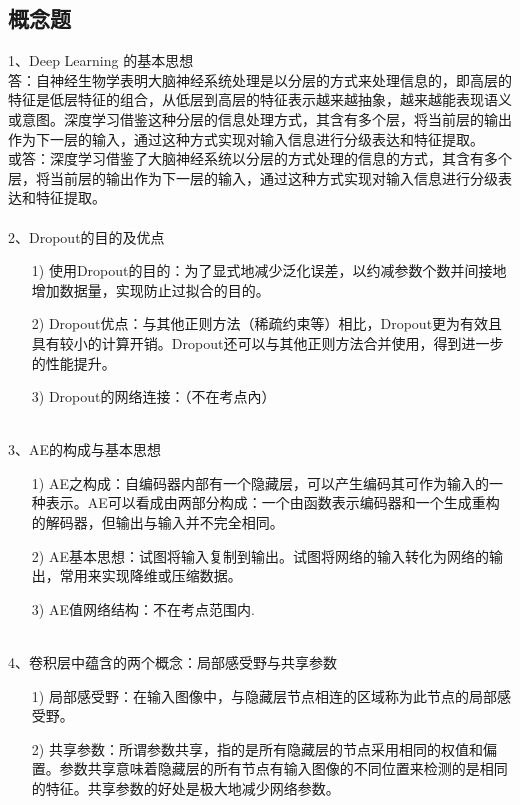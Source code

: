 \documentclass[UFT8]{ctexart}
\begin{document}
\subsection{概念题}
1、Deep Learning 的基本思想\\
答：自神经生物学表明大脑神经系统处理是以分层的方式来处理信息的，即高层的特征是低层特征的组合，从低层到高层的特征表示越来越抽象，越来越能表现语义或意图。深度学习借鉴这种分层的信息处理方式，其含有多个层，将当前层的输出作为下一层的输入，通过这种方式实现对输入信息进行分级表达和特征提取。\\
或答：深度学习借鉴了大脑神经系统以分层的方式处理的信息的方式，其含有多个层，将当前层的输出作为下一层的输入，通过这种方式实现对输入信息进行分级表达和特征提取。
~\\
~\\
 2、Dropout的目的及优点
\begin{itemize}
\item[1)] 使用Dropout的目的：为了显式地减少泛化误差，以约减参数个数并间接地增加数据量，实现防止过拟合的目的。
\item[2)] Dropout优点：与其他正则方法（稀疏约束等）相比，Dropout更为有效且具有较小的计算开销。Dropout还可以与其他正则方法合并使用，得到进一步的性能提升。
\item[3)] Dropout的网络连接：（不在考点內）
\end{itemize}
~\\
3、AE的构成与基本思想
\begin{itemize}
\item[1)] AE之构成：自编码器内部有一个隐藏层，可以产生编码其可作为输入的一种表示。AE可以看成由两部分构成：一个由函数表示编码器和一个生成重构的解码器，但输出与输入并不完全相同。
\item[2)] AE基本思想：试图将输入复制到输出。试图将网络的输入转化为网络的输出，常用来实现降维或压缩数据。
\item[3)] AE值网络结构：不在考点范围内.
\end{itemize}
~\\
4、卷积层中蕴含的两个概念：局部感受野与共享参数
\begin{itemize}
\item[1)] 局部感受野：在输入图像中，与隐藏层节点相连的区域称为此节点的局部感受野。
\item[2)] 共享参数：所谓参数共享，指的是所有隐藏层的节点采用相同的权值和偏置。参数共享意味着隐藏层的所有节点有输入图像的不同位置来检测的是相同的特征。共享参数的好处是极大地减少网络参数。
\end{itemize}
~\\
\end{document}

